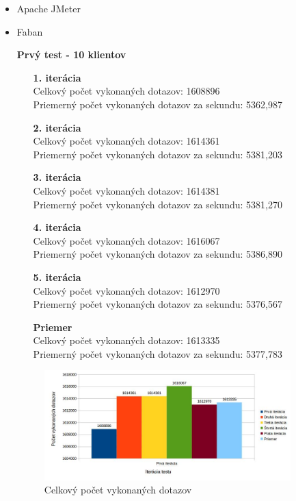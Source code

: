 \documentclass[12pt,oneside,final]{fithesis-utf8}
\begin{document}
\begin{itemize}

\item Apache JMeter

\item Faban

\textbf{Prvý test - 10 klientov}
\begin{itemize}

\item[\textbf{1. iterácia}]\ \\
Celkový počet vykonaných dotazov: 1608896\\
Priemerný počet vykonaných dotazov za sekundu: 5362,987

\item[\textbf{2. iterácia}]\ \\
Celkový počet vykonaných dotazov: 1614361\\
Priemerný počet vykonaných dotazov za sekundu: 5381,203

\item[\textbf{3. iterácia}]\ \\
Celkový počet vykonaných dotazov: 1614381\\
Priemerný počet vykonaných dotazov za sekundu: 5381,270

\item[\textbf{4. iterácia}]\ \\
Celkový počet vykonaných dotazov: 1616067\\
Priemerný počet vykonaných dotazov za sekundu: 5386,890

\item[\textbf{5. iterácia}]\ \\
Celkový počet vykonaných dotazov: 1612970\\
Priemerný počet vykonaných dotazov za sekundu: 5376,567

\item[\textbf{Priemer}]\ \\
Celkový počet vykonaných dotazov: 1613335\\
Priemerný počet vykonaných dotazov za sekundu: 5377,783

\end{itemize}

\begin{figure}[H]
  \centering
      \includegraphics[width=0.9\textwidth]{faban2_1.jpg}
  \caption{Celkový počet vykonaných dotazov}
\end{figure}


\end{itemize}
\end{document}
